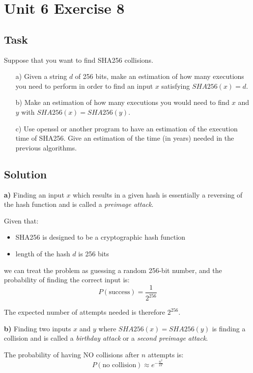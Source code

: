 \section{Unit 6 Exercise 8}

\subsection{Task}
Suppose that you want to find SHA256 collisions.
\begin{enumerate}
    \item[a)] Given a string \(d\) of 256 bits, make an estimation of how many executions you need to perform in order to find an input \(x\) satisfying \(SHA256(x) = d\).
    \item[b)] Make an estimation of how many executions you would need to find \(x\) and \(y\) with \(SHA256(x) = SHA256(y)\).
    \item[c)] Use openssl or another program to have an estimation of the execution time of SHA256. Give an estimation of the time (in years) needed in the previous algorithms.
\end{enumerate}

\subsection{Solution}

\textbf{a)} Finding an input $x$ which results in a given hash is essentially a reversing of the hash function and is called a \textit{preimage attack}.

Given that:
\begin{itemize}
    \item SHA256 is designed to be a cryptographic hash function
    \item length of the hash $d$ is 256 bits
\end{itemize}

we can treat the problem as guessing a random 256-bit number, and the probability of finding the correct input is:
\[ P(\text{success}) = \frac{1}{2^{256}} \]

The expected number of attempts needed is therefore $2^{256}$.

\textbf{b)} Finding two inputs \(x\) and \(y\) where \(SHA256(x) = SHA256(y)\) is finding a collision and is called a \textit{birthday attack} or a \textit{second preimage attack}.

The probability of having NO collisions after $n$ attempts is:
\begin{equation}
    P(\text{no collision}) \approx e^{-\frac{n^2}{2T}}
\end{equation}


